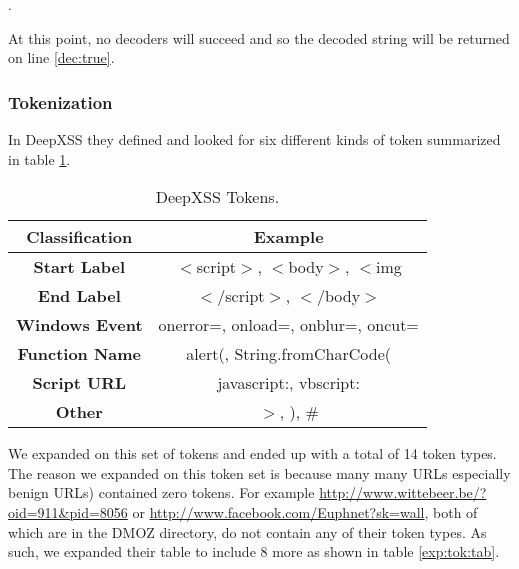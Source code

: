 . 

At this point, no decoders will succeed and so the decoded string will be returned on line \ref{dec:true}.


\subsubsection{Tokenization}
In DeepXSS they defined and looked for six different kinds of token summarized in table \ref{tok:tab}.

\begin{table}
\begin{center}
\begingroup
\setlength{\tabcolsep}{5pt} %
\renewcommand{\arraystretch}{1.5} %
\begin{tabular}{||c | c||} 
    \hline
    Classification & Example \\ [0.5ex] 
    \hline\hline
    \textbf{Start Label} &  $<$script$>$, $<$body$>$, $<$img \\ 
    \hline
    \textbf{End Label} & $</$script$>$, $</$body$>$ \\
    \hline
    \textbf{Windows Event} & onerror=, onload=, onblur=, oncut= \\
    \hline
    \textbf{Function Name} & alert(, String.fromCharCode( \\
    \hline
    \textbf{Script URL} & javascript:, vbscript: \\ 
    \hline
    \textbf{Other} & $>$, ), \# \\ [1ex] 
    \hline
\end{tabular}
\endgroup
\caption{\label{tok:tab}DeepXSS Tokens.}
\end{center}
\end{table}

We expanded on this set of tokens and ended up with a total of 14 token types. The reason we expanded on this token set is because many many URLs especially benign URLs) contained zero tokens. For example \url{http://www.wittebeer.be/?oid=911\&pid=8056} or \url{http://www.facebook.com/Euphnet?sk=wall}, both of which are in the DMOZ directory, do not contain any of their token types. As such, we expanded their table to include 8 more as shown in table \ref{exp:tok:tab}.

